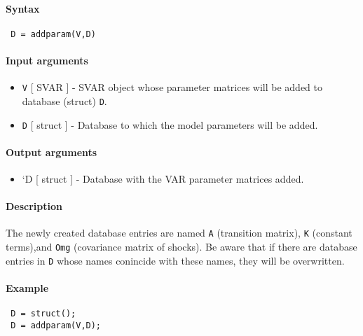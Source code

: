 


	\paragraph{Syntax}
 
 \begin{verbatim}
 D = addparam(V,D)
 \end{verbatim}
 
 \paragraph{Input arguments}
 
 \begin{itemize}
 \item
   \texttt{V} {[} SVAR {]} - SVAR object whose parameter matrices will be
   added to database (struct) \texttt{D}.
 \item
   \texttt{D} {[} struct {]} - Database to which the model parameters
   will be added.
 \end{itemize}
 
 \paragraph{Output arguments}
 
 \begin{itemize}
 \item
   `D {[} struct {]} - Database with the VAR parameter matrices added.
 \end{itemize}
 
 \paragraph{Description}
 
 The newly created database entries are named \texttt{A} (transition
 matrix), \texttt{K} (constant terms),and \texttt{Omg} (covariance matrix
 of shocks). Be aware that if there are database entries in \texttt{D}
 whose names conincide with these names, they will be overwritten.
 
 \paragraph{Example}
 
 \begin{verbatim}
 D = struct();
 D = addparam(V,D);
 \end{verbatim}


